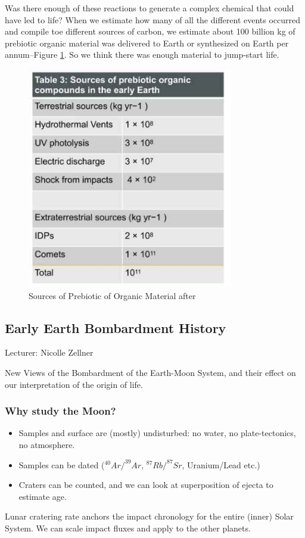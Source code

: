 \documentclass[]{article}
\begin{document}
Was there enough of these reactions to generate a complex chemical that could have led to life? When we estimate how many of all the different events occurred and compile toe different sources of carbon, we estimate about 100 billion kg of prebiotic organic material was delivered to Earth or synthesized on Earth per annum--Figure \ref{fig:SourcesPrebioticOrganicMaterial}. So we think there was enough material to jump-start life.

\begin{figure}[H]
	\begin{center}
		\caption[Sources of Prebiotic of Organic Material]{Sources of Prebiotic of Organic Material after \cite{chyba1997comets}} \label{fig:SourcesPrebioticOrganicMaterial}
		\includegraphics[width=0.8\textwidth]{SourcesPrebioticOrganicMaterial}
	\end{center}
\end{figure}


\subsection{Early Earth Bombardment History }

Lecturer: Nicolle Zellner

New Views of the Bombardment of the Earth-Moon System, and their effect on our interpretation of the origin of life.

\subsubsection{Why study the Moon?}
\begin{itemize}
	\item Samples and surface are (mostly) undisturbed: no water, no plate-tectonics, no atmosphere.
	\item Samples can be dated ($^{40}Ar/^{39}Ar$, $^{87}Rb/^{87}Sr$, Uranium/Lead etc.)
	\item Craters can be counted, and we can look at superposition of ejecta to estimate age.
\end{itemize}
Lunar cratering rate anchors the impact chronology for the entire (inner) Solar System. We can scale impact fluxes and apply to the other planets.
\end{document}
